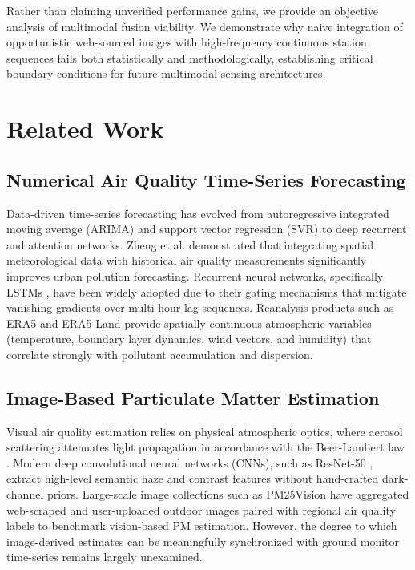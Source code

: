 \documentclass[conference]{IEEEtran}
\begin{document}
Rather than claiming unverified performance gains, we provide an objective analysis of multimodal fusion viability. We demonstrate why naive integration of opportunistic web-sourced images with high-frequency continuous station sequences fails both statistically and methodologically, establishing critical boundary conditions for future multimodal sensing architectures.

\section{Related Work}

\subsection{Numerical Air Quality Time-Series Forecasting}
Data-driven time-series forecasting has evolved from autoregressive integrated moving average (ARIMA) and support vector regression (SVR) to deep recurrent and attention networks. Zheng et al. \cite{zheng2015forecasting} demonstrated that integrating spatial meteorological data with historical air quality measurements significantly improves urban pollution forecasting. Recurrent neural networks, specifically LSTMs \cite{hochreiter1997lstm}, have been widely adopted due to their gating mechanisms that mitigate vanishing gradients over multi-hour lag sequences. Reanalysis products such as ERA5 and ERA5-Land \cite{hersbach2020era5, munoz2021era5land} provide spatially continuous atmospheric variables (temperature, boundary layer dynamics, wind vectors, and humidity) that correlate strongly with pollutant accumulation and dispersion.

\subsection{Image-Based Particulate Matter Estimation}
Visual air quality estimation relies on physical atmospheric optics, where aerosol scattering attenuates light propagation in accordance with the Beer-Lambert law \cite{liu2016particle}. Modern deep convolutional neural networks (CNNs), such as ResNet-50 \cite{he2016resnet}, extract high-level semantic haze and contrast features without hand-crafted dark-channel priors. Large-scale image collections such as PM25Vision \cite{pm25vision2023} have aggregated web-scraped and user-uploaded outdoor images paired with regional air quality labels to benchmark vision-based PM estimation. However, the degree to which image-derived estimates can be meaningfully synchronized with ground monitor time-series remains largely unexamined.
\end{document}
